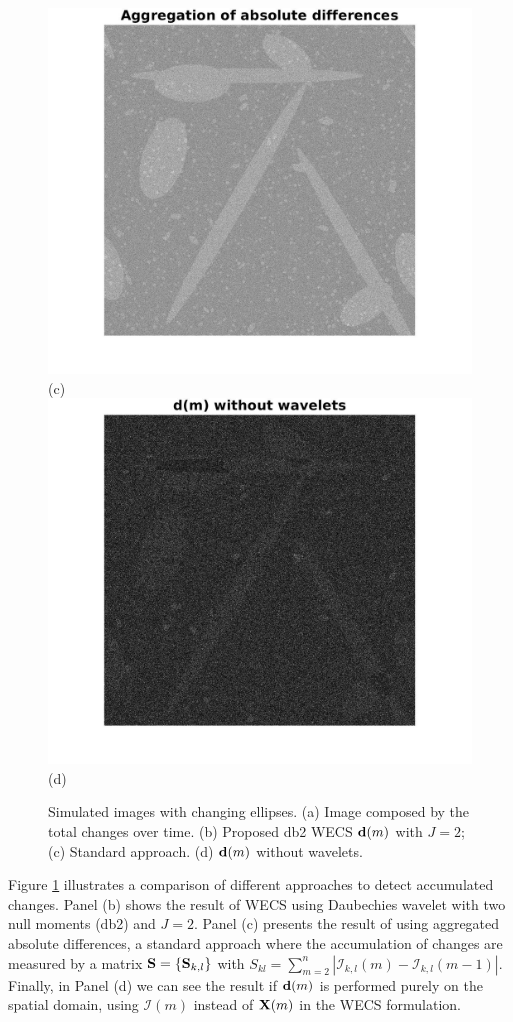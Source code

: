 \documentclass[journal]{IEEEtran}
\newcommand{\vd}{{\textbf d}}
\newcommand{\vS}{{\textbf S}}
\newcommand{\vX}{{\textbf X}}
\begin{document}
\begin{figure}[htp!]
\includegraphics[scale=.1]{../../figs/corr_changes_logratios}(c)
\includegraphics[scale=.1]{../../figs/corr_changes_dm_nowavelets}(d)
\caption{Simulated images with changing ellipses. (a) Image composed by the total changes over time. (b) Proposed db2 WECS $\vd(m)$ with $J=2$; (c) Standard approach. (d) $\vd(m)$ without wavelets.}
\label{F:Changes_methods_images}
\end{figure}

Figure \ref{F:Changes_methods_images} illustrates a comparison of different approaches to detect accumulated changes. Panel (b) shows the result of WECS using Daubechies wavelet with two null moments (db2) and $J=2$. Panel (c) presents the result of using aggregated absolute differences, a standard approach where the accumulation of changes are measured by a matrix $\vS=\{\vS_{k,l}\}$ with $S_{kl} = \sum_{m=2}^n	|\mathcal{I}_{k,l}(m) - \mathcal{I}_{k,l}(m-1)|$. Finally, in Panel (d) we can see the result if $\vd(m)$ is performed purely on the spatial domain, using $\mathcal{I}(m)$ instead of $\vX(m)$ in the WECS formulation. 
\end{document}
